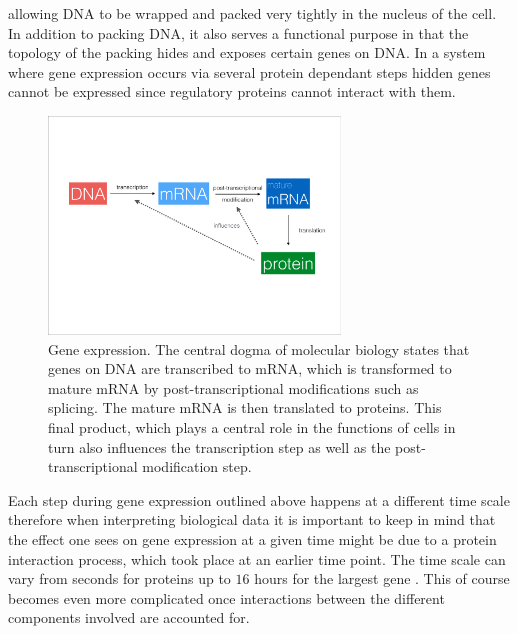 allowing DNA to be wrapped and packed very tightly in the nucleus of the cell. In addition to packing DNA, it also serves a functional purpose in that the topology of the packing hides and exposes certain genes on DNA. In a system where gene expression occurs via several protein dependant steps hidden genes cannot be expressed since regulatory proteins cannot interact with them.

\begin{figure}[!t]
  \centering
  \includegraphics[width=0.69\textwidth]{pics/dogma-bio.pdf}
  \caption{Gene expression. The central dogma of molecular biology states that genes on DNA are transcribed to mRNA, which is transformed to mature mRNA by post-transcriptional modifications such as splicing. The mature mRNA is then translated to proteins. This final product, which plays a central role in the functions of cells in turn also influences the transcription step as well as the post-transcriptional modification step.}
  \label{fig:gene-expression}
\end{figure}

Each step during gene expression outlined above happens at a different time scale therefore when interpreting biological data it is important to keep in mind that the effect one sees on gene expression at a given time might be due to a protein interaction process, which took place at an earlier time point. The time scale can vary from seconds for proteins \citep{Herce:kq} up to $16$ hours for the largest gene \citep{Tennyson:1995dl}. This of course becomes even more complicated once interactions between the different components involved are accounted for.

